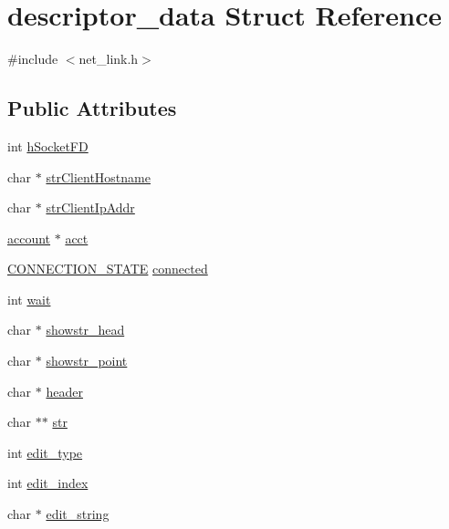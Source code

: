 \hypertarget{structdescriptor__data}{\section{descriptor\-\_\-data Struct Reference}
\label{structdescriptor__data}
}


{\ttfamily \#include $<$net\-\_\-link.\-h$>$}

\subsection*{Public Attributes}
\begin{DoxyCompactItemize}
\item 
int \hyperlink{structdescriptor__data_a796b6146ab65b5bae1422c6f0833be6e}{h\-Socket\-F\-D}
\item 
char $\ast$ \hyperlink{structdescriptor__data_a07f8f445fc74f6b4c7c9889fe29f1d6a}{str\-Client\-Hostname}
\item 
char $\ast$ \hyperlink{structdescriptor__data_a30abed2465d987f5b96ead979106184f}{str\-Client\-Ip\-Addr}
\item 
\hyperlink{classaccount}{account} $\ast$ \hyperlink{structdescriptor__data_a1224d9582f87f982f8a763104818f777}{acct}
\item 
\hyperlink{net__link_8h_a8a4c611a3d90a77a1644eb82cca89d6f}{C\-O\-N\-N\-E\-C\-T\-I\-O\-N\-\_\-\-S\-T\-A\-T\-E} \hyperlink{structdescriptor__data_a877c67e191b22b292a8042c3f19904c8}{connected}
\item 
int \hyperlink{structdescriptor__data_afc7b938bbe08cdfb70ee8c7dab22b386}{wait}
\item 
char $\ast$ \hyperlink{structdescriptor__data_a98b3190f073a34db5ea45829482c11de}{showstr\-\_\-head}
\item 
char $\ast$ \hyperlink{structdescriptor__data_ad7526788b6c074cfe633b2dff9164e83}{showstr\-\_\-point}
\item 
char $\ast$ \hyperlink{structdescriptor__data_a4aedce32bb89bff9112a979a482773e5}{header}
\item 
char $\ast$$\ast$ \hyperlink{structdescriptor__data_a4c9e7d862a4f976d1fe99859e2d1d4f5}{str}
\item 
int \hyperlink{structdescriptor__data_ab6e48ea6c625165f4b5d67d89072dbef}{edit\-\_\-type}
\item 
int \hyperlink{structdescriptor__data_a1ee9e1bd1854d87f3ce75ed9daf504a5}{edit\-\_\-index}
\item 
char $\ast$ \hyperlink{structdescriptor__data_a8e21c5632e3d3d9c15116b5599f8502c}{edit\-\_\-string}
$$
\end{DoxyCompactItemize}
